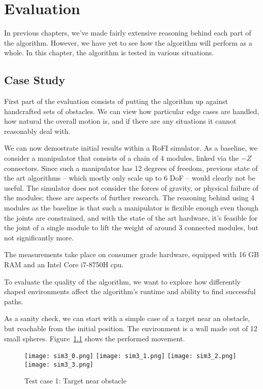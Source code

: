 \chapter{Evaluation}

In previous chapters, we've made fairly extensive reasoning behind each part of the algorithm. However, we have yet to see how the algorithm will perform as a whole. In this chapter, the algorithm is tested in various situations.

\section{Case Study}

First part of the evaluation consists of putting the algorithm up against handcrafted sets of obstacles. We can view how particular edge cases are handled, how natural the overall motion is, and if there are any situations it cannot reasonably deal with.

We can now demostrate initial results within a RoFI simulator. As a baseline, we consider a manipulator that consists of a chain of 4 modules, linked via the $-Z$ connectors. Since such a manipulator has 12 degrees of freedom, previous state of the art algorithms -- which mostly only scale up to 6 DoF -- would clearly not be useful.
The simulator does not consider the forces of gravity, or physical failure of the modules; these are aspects of further research. The reasoning behind using 4 modules as the baseline is that such a manipulator is flexible enough even though the joints are constrained, and with the state of the art hardware, it's feasible for the joint of a single module to lift the weight of around 3 connected modules, but not significantly more.

The measurements take place on consumer grade hardware, equipped with 16 GB RAM and an Intel Core i7-8750H cpu.

To evaluate the quality of the algorithm, we want to explore how differently shaped environments affect the algorithm's runtime and ability to find successful paths.

As a sanity check, we can start with a simple case of a target near an obstacle, but reachable from the initial position. The environment is a wall made out of 12 small spheres. Figure~\ref{fig:sim3} shows the performed movement.

\begin{figure}
  \centering
  \begin{minipage}{\textwidth}
    \texttt{[image: sim3\_0.png]}
    \texttt{[image: sim3\_1.png]}
    \texttt{[image: sim3\_2.png]}
    \texttt{[image: sim3\_3.png]}
  \end{minipage}
  \caption{Test case 1: Target near obstacle}\label{fig:sim3}
\end{figure}

